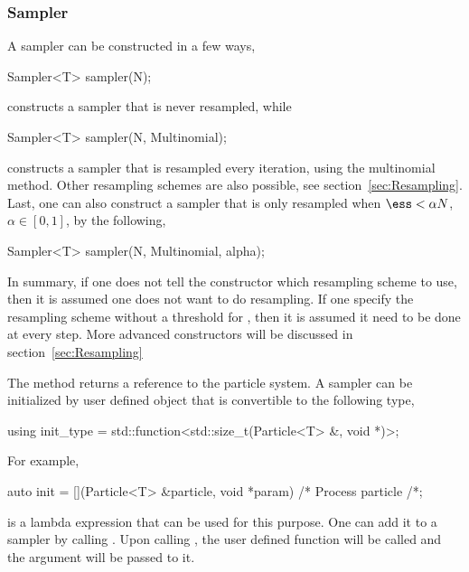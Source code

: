 \subsubsection{Sampler}
\label{ssub:Sampler}

A sampler can be constructed in a few ways,
\begin{cppcode}
  Sampler<T> sampler(N);
\end{cppcode}
constructs a sampler that is never resampled, while
\begin{cppcode}
  Sampler<T> sampler(N, Multinomial);
\end{cppcode}
constructs a sampler that is resampled every iteration, using the multinomial
method. Other resampling schemes are also possible, see
section~\ref{sec:Resampling}. Last, one can also construct a sampler that is
only resampled when $\ess < \alpha N$, $\alpha\in[0, 1]$, by the following,
\begin{cppcode}
  Sampler<T> sampler(N, Multinomial, alpha);
\end{cppcode}
In summary, if one does not tell the constructor which resampling scheme to
use, then it is assumed one does not want to do resampling. If one specify the
resampling scheme without a threshold for \ess, then it is assumed it need to
be done at every step. More advanced constructors will be discussed in
section~\ref{sec:Resampling}

The method  returns a reference to the particle
system. A sampler can be initialized by user defined object that is convertible
to the following type,
\begin{cppcode}
  using init_type = std::function<std::size_t(Particle<T> &, void *)>;
\end{cppcode}
For example,
\begin{cppcode}
  auto init = [](Particle<T> &particle, void *param) { /* Process particle /*};
\end{cppcode}
is a \cppoo lambda expression that can be used for this purpose. One can add it
to a sampler by calling . Upon calling
, the user defined function
 will be called and the argument  will be
passed to it.

